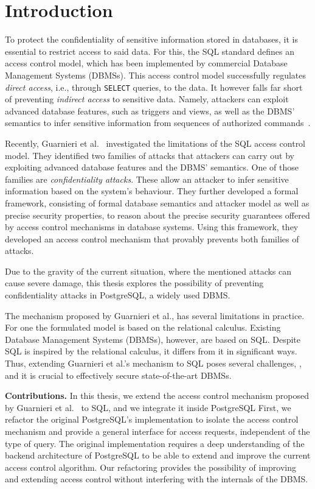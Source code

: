 \section{Introduction}
To protect the confidentiality of sensitive information stored in databases, it is essential to restrict access to said data.
%
For this, the SQL standard defines an access control model, which has been implemented by commercial Database Management Systems (DBMSs). 
%
This access control model successfully regulates \emph{direct access}, i.e., through \texttt{SELECT} queries, to the data. It however falls far short of preventing \emph{indirect access} to sensitive data.
%
Namely, attackers can exploit advanced database features, such as triggers and views, as well as the DBMS' semantics to infer sensitive information from sequences of authorized commands~\cite{guarnieri2016strong}.
%

Recently, Guarnieri et al.~\cite{guarnieri2016strong} investigated the limitations of the SQL access control model. 
%
They identified two families of attacks that attackers can carry out by exploiting advanced database features and the DBMS' semantics.
%
One of those families are \emph{confidentiality attacks}. These allow an attacker to infer sensitive information based on the system's behaviour.
%
They further developed a formal framework, consisting of formal database semantics and attacker model as well as precise security properties, to reason about the precise security guarantees offered by access control mechanisms in database systems.
%
Using this framework, they developed an access control mechanism that provably prevents both families of attacks.

Due to the gravity of the current situation, where the mentioned attacks can cause severe damage, this thesis explores the possibility of preventing confidentiality attacks in PostgreSQL, a widely used DBMS.

The mechanism proposed by Guarnieri et al., has several limitations in practice.
%
For one the formulated model is based on the relational calculus. 
%
Existing Database Management Systems (DBMSs), however, are based on SQL.
%
Despite SQL is inspired by the relational calculus, it differs from it in significant ways.
%
Thus, extending Guarnieri et al.'s mechanism to SQL poses several challenges, , and it is crucial to effectively secure state-of-the-art DBMSs.

\smallskip
\noindent
{\bf Contributions.}
%
In this thesis, we extend  the access control mechanism proposed by Guarnieri et al.~\cite{guarnieri2016strong} to SQL, and we integrate it inside PostgreSQL
%
First, we refactor the original PostgreSQL's implementation to isolate the access control mechanism and provide a general interface for access requests, independent of the type of query.
%
The original implementation requires a deep understanding of the backend architecture of PostgreSQL to be able to extend and improve the current access control algorithm.
%
Our refactoring provides the possibility of improving and extending access control without interfering with the internals of the DBMS.

